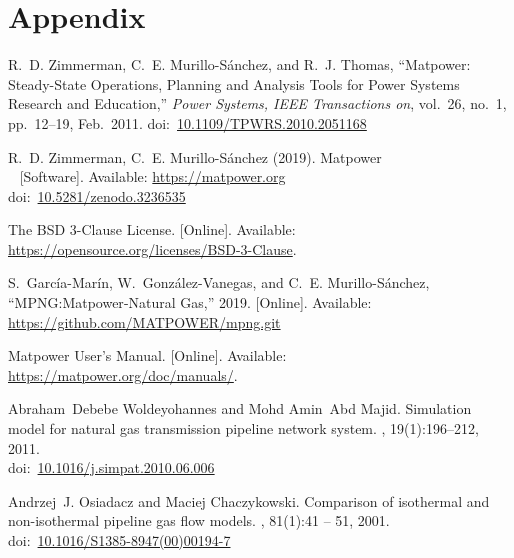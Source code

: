 \documentclass[12pt,a4paper,oneside]{book}
\newcommand{\mpngurl}[0]{https://github.com/MATPOWER/mpng.git}
\newcommand{\matpower}[0]{{\sc Matpower}}
\newcommand{\doi}[1]{doi:~\href{https://doi.org/#1}{#1}}
\begin{document}
	
	\tableofcontents                            
	\listoffigures
	\listoftables	
	
	
	
	
	
	
	\part*{Appendix}
		
	
	\clearpage	
	\begin{thebibliography}{99}
	R.~D. Zimmerman, C.~E. Murillo-S{\'a}nchez, and R.~J. Thomas, ``\matpower{}: Steady-State Operations, Planning and Analysis Tools for Power Systems Research and Education,'' \emph{Power Systems, IEEE Transactions on}, vol.~26, no.~1, pp.~12--19, Feb.~2011.
	\doi{10.1109/TPWRS.2010.2051168}
	
	R.~D. Zimmerman, C.~E. Murillo-S{\'a}nchez (2019). \matpower{}\\~
	[Software]. Available: \url{https://matpower.org}\\
	\doi{10.5281/zenodo.3236535}
	
	The BSD 3-Clause License. [Online]. Available: \url{https://opensource.org/licenses/BSD-3-Clause}.
	
	S.~García-Marín, W.~González-Vanegas, and C.~E. Murillo-Sánchez, ``MPNG:\matpower{}-Natural Gas,'' 2019.
	[Online]. Available: \url{\mpngurl}
		
	\matpower{} User's Manual. [Online]. Available: \url{https://matpower.org/doc/manuals/}.	
	
	Abraham~Debebe Woldeyohannes and Mohd Amin~Abd Majid.
	\newblock Simulation model for natural gas transmission pipeline network
	system.
	, 19(1):196--212, 2011.\\
	\doi{10.1016/j.simpat.2010.06.006}	
	
	Andrzej~J. Osiadacz and Maciej Chaczykowski.
	\newblock Comparison of isothermal and non-isothermal pipeline gas flow models. 
	, 81(1):41 -- 51, 2001.\\
	\doi{10.1016/S1385-8947(00)00194-7}	
	

\end{thebibliography}
\end{document}

